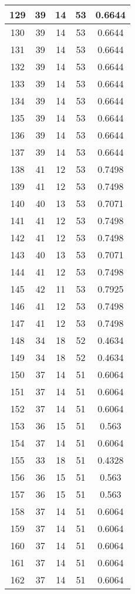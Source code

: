 \documentclass[letterpaper, 12pt]{article}
\begin{document}
\begin{longtable}{|c|c|c|c|c|}
\hline
129 & 39 & 14 & 53 & 0.6644 \\
\hline
130 & 39 & 14 & 53 & 0.6644 \\
\hline
131 & 39 & 14 & 53 & 0.6644 \\
\hline
132 & 39 & 14 & 53 & 0.6644 \\
\hline
133 & 39 & 14 & 53 & 0.6644 \\
\hline
134 & 39 & 14 & 53 & 0.6644 \\
\hline
135 & 39 & 14 & 53 & 0.6644 \\
\hline
136 & 39 & 14 & 53 & 0.6644 \\
\hline
137 & 39 & 14 & 53 & 0.6644 \\
\hline
138 & 41 & 12 & 53 & 0.7498 \\
\hline
139 & 41 & 12 & 53 & 0.7498 \\
\hline
140 & 40 & 13 & 53 & 0.7071 \\
\hline
141 & 41 & 12 & 53 & 0.7498 \\
\hline
142 & 41 & 12 & 53 & 0.7498 \\
\hline
143 & 40 & 13 & 53 & 0.7071 \\
\hline
144 & 41 & 12 & 53 & 0.7498 \\
\hline
145 & 42 & 11 & 53 & 0.7925 \\
\hline
146 & 41 & 12 & 53 & 0.7498 \\
\hline
147 & 41 & 12 & 53 & 0.7498 \\
\hline
148 & 34 & 18 & 52 & 0.4634 \\
\hline
149 & 34 & 18 & 52 & 0.4634 \\
\hline
150 & 37 & 14 & 51 & 0.6064 \\
\hline
151 & 37 & 14 & 51 & 0.6064 \\
\hline
152 & 37 & 14 & 51 & 0.6064 \\
\hline
153 & 36 & 15 & 51 & 0.563 \\
\hline
154 & 37 & 14 & 51 & 0.6064 \\
\hline
155 & 33 & 18 & 51 & 0.4328 \\
\hline
156 & 36 & 15 & 51 & 0.563 \\
\hline
157 & 36 & 15 & 51 & 0.563 \\
\hline
158 & 37 & 14 & 51 & 0.6064 \\
\hline
159 & 37 & 14 & 51 & 0.6064 \\
\hline
160 & 37 & 14 & 51 & 0.6064 \\
\hline
161 & 37 & 14 & 51 & 0.6064 \\
\hline
162 & 37 & 14 & 51 & 0.6064 \\

\end{longtable}
\end{document}
